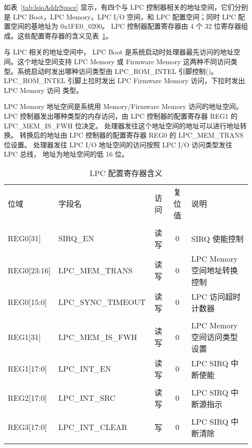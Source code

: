 如表~\ref{tab:lsioAddrSpace} 显示，有四个与 LPC
控制器相关的地址空间，它们分别是 LPC Boot，LPC Memory，LPC I/O 空间，和 LPC
配置空间；同时 LPC 配置空间的基地址为 0x1FE0\_0200。 LPC 控制器配置寄存器由 4
个 32 位寄存器组成。这些配置寄存器的含义见表~\ref{tab:LPCreg}。

与 LPC 相关的地址空间中， LPC Boot
是系统启动时处理器最先访问的地址空间。这个地址空间支持 LPC Memory 或 Firmware
Memory 这两种不同访问类型。系统启动时发出哪种访问类型由 LPC\_ROM\_INTEL
引脚控制()。LPC\_ROM\_INTEL
引脚上拉时发出 LPC Firmware Memory 访问，下拉时发出 LPC Memory 访问 类型。

LPC Memory 地址空间是系统用 Memory/Firmware Memory 访问的地址空间。 LPC
控制器发出哪种类型的内存访问，由 LPC 控制器的配置寄存器 REG1 的
LPC\_MEM\_IS\_FWH 位决定。 处理器发往这个地址空间的地址可以进行地址转换。
转换后的地址由 LPC 控制器的配置寄存器 REG0 的 LPC\_MEM\_TRANS 位设置。
处理器发往 LPC I/O 地址空间的访问按照 LPC I/O 访问类型发往 LPC 总线，
地址为地址空间的低 16 位。

\begin{table}
  \centering
  \begin{tabular}{|l|l|c|c|p{6cm}|} \hline
    位域        & 字段名             & 访问 & 复位值 & 说明 \\ \hhline
    \multicolumn{5}{|l|}{REG0} \\ \hline
    REG0[31] & SIRQ\_EN              & 读写 & 0      & SIRQ 使能控制 \\ \hline
    REG0[23:16] & LPC\_MEM\_TRANS    & 读写 & 0      & LPC Memory 空间地址转换控制 \\ \hline
    REG0[15:0]  & LPC\_SYNC\_TIMEOUT & 读写 & 0      & LPC 访问超时计数器 \\ \hhline
    \multicolumn{5}{|l|}{REG1} \\ \hline
    REG1[31] & LPC\_MEM\_IS\_FWH     & 读写 & 0      & LPC Memory 空间访问类型设置 \\ \hline
    REG1[17:0]  & LPC\_INT\_EN       & 读写 & 0      & LPC SIRQ 中断使能 \\ \hhline
    \multicolumn{5}{|l|}{REG2} \\ \hline
    REG2[17:0]  & LPC\_INT\_SRC      & 读写 & 0      & LPC SIRQ 中断源指示 \\ \hhline
    \multicolumn{5}{|l|}{REG3} \\ \hline
    REG3[17:0]  & LPC\_INT\_CLEAR    & 写   & 0      & LPC SIRQ 中断清除 \\ \hhline
  \end{tabular}
  \caption{LPC 配置寄存器含义}
  \label{tab:LPCreg}
\end{table}

